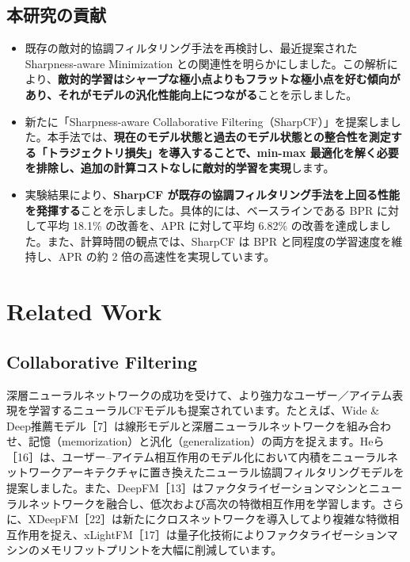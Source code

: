 \documentclass[11pt,a4paper]{article}
\begin{document}
\subsection{本研究の貢献}

\begin{itemize}
    \item 既存の敵対的協調フィルタリング手法を再検討し、最近提案された Sharpness-aware Minimization との関連性を明らかにしました。この解析により、\textbf{敵対的学習はシャープな極小点よりもフラットな極小点を好む傾向があり、それがモデルの汎化性能向上につながる}ことを示しました。
    \item 新たに「Sharpness-aware Collaborative Filtering（SharpCF）」を提案しました。本手法では、\textbf{現在のモデル状態と過去のモデル状態との整合性を測定する「トラジェクトリ損失」を導入することで、min-max 最適化を解く必要を排除し、追加の計算コストなしに敵対的学習を実現}します。
    \item 実験結果により、\textbf{SharpCF が既存の協調フィルタリング手法を上回る性能を発揮する}ことを示しました。具体的には、ベースラインである BPR に対して平均 18.1\% の改善を、APR に対して平均 6.82\% の改善を達成しました。また、計算時間の観点では、SharpCF は BPR と同程度の学習速度を維持し、APR の約 2 倍の高速性を実現しています。
\end{itemize}

\section{Related Work}

\subsection{Collaborative Filtering}

深層ニューラルネットワークの成功を受けて、より強力なユーザー／アイテム表現を学習するニューラルCFモデルも提案されています。たとえば、Wide \& Deep推薦モデル［7］は線形モデルと深層ニューラルネットワークを組み合わせ、記憶（memorization）と汎化（generalization）の両方を捉えます。Heら［16］は、ユーザー–アイテム相互作用のモデル化において内積をニューラルネットワークアーキテクチャに置き換えたニューラル協調フィルタリングモデルを提案しました。また、DeepFM［13］はファクタライゼーションマシンとニューラルネットワークを融合し、低次および高次の特徴相互作用を学習します。さらに、XDeepFM［22］は新たにクロスネットワークを導入してより複雑な特徴相互作用を捉え、xLightFM［17］は量子化技術によりファクタライゼーションマシンのメモリフットプリントを大幅に削減しています。
\end{document}
